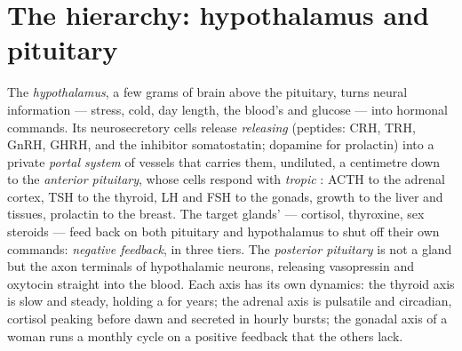 \section{The hierarchy: hypothalamus and pituitary}

\begin{definition}\label{def:b3:endocrinology:axes}
The \emph{hypothalamus}, a few grams of brain above the pituitary,
turns neural information --- stress, cold, day length, the blood's
 and glucose --- into hormonal commands. Its
neurosecretory cells release \emph{releasing } (peptides:
CRH, TRH, GnRH, GHRH, and the inhibitor somatostatin; dopamine for
prolactin) into a private \emph{portal system} of vessels that
carries them, undiluted, a centimetre down to the \emph{anterior
pituitary}, whose cells respond with \emph{tropic }: ACTH to
the adrenal cortex, TSH to the thyroid, LH and FSH to the gonads,
growth  to the liver and tissues, prolactin to the breast. The
target glands'  --- cortisol, thyroxine, sex steroids ---
feed back on both pituitary and hypothalamus to shut off their own
commands: \emph{negative feedback}, in three tiers. The
\emph{posterior pituitary} is not a gland but the axon terminals of
hypothalamic neurons, releasing vasopressin and oxytocin straight into
the blood. Each axis has its own dynamics: the thyroid axis is slow
and steady, holding a  for years; the adrenal axis is
pulsatile and circadian, cortisol peaking before dawn and secreted in
hourly bursts; the gonadal axis of a woman runs a monthly cycle on a
positive feedback that the others lack.
\end{definition}

